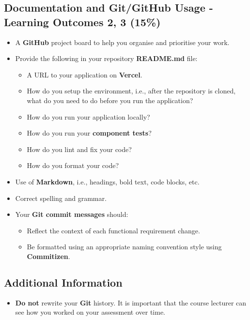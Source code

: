 \documentclass{article}
\begin{document}
\subsection*{Documentation and Git/GitHub Usage - Learning Outcomes 2, 3 (15\%)}
\begin{itemize}
	\item A \textbf{GitHub} project board to help you organise and prioritise your work. 
	\item Provide the following in your repository \textbf{README.md} file:
	\begin{itemize}
		\item A URL to your application on \textbf{Vercel}.
		\item How do you setup the environment, i.e., after the repository is cloned, what do you need to do before you run the application?
		\item How do you run your application locally?
		\item How do you run your \textbf{component tests}?
		\item How do you lint and fix your code?
		\item How do you format your code?
	\end{itemize}
	\item Use of \textbf{Markdown}, i.e., headings, bold text, code blocks, etc.
	\item Correct spelling and grammar. 
	\item Your \textbf{Git commit messages} should:
	\begin{itemize}
		\item Reflect the context of each functional requirement change.
		\item Be formatted using an appropriate naming convention style using \textbf{Commitizen}.
	\end{itemize}	
\end{itemize}

\subsection*{Additional Information}
\begin{itemize}
	\item \textbf{Do not} rewrite your \textbf{Git} history. It is important that the course lecturer can see how you worked on your assessment over time.
\end{itemize}
\end{document}
